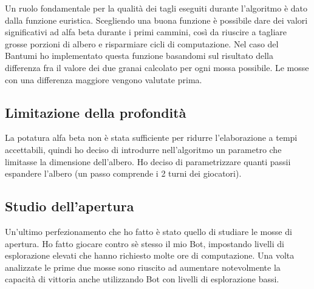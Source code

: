 \documentclass[paper=a4, fontsize=11pt]{scrartcl}	%
\numberwithin{equation}{section}															%
\numberwithin{figure}{section}																%
\numberwithin{table}{section}																%
\begin{document}
Un ruolo fondamentale per la qualit\`a dei tagli eseguiti durante l'algoritmo \`e dato dalla funzione euristica. Scegliendo una buona funzione \`e possibile dare dei valori significativi ad alfa beta durante i primi cammini, cos\`i da riuscire a tagliare grosse porzioni di albero e risparmiare cicli di computazione.
Nel caso del Bantumi ho implementato questa funzione basandomi sul risultato della differenza fra il valore dei due granai calcolato per ogni mossa possibile. Le mosse con una differenza maggiore vengono valutate prima.
\subsection{Limitazione della profondit\`a}
La potatura alfa beta non \`e stata sufficiente per ridurre l'elaborazione a tempi accettabili, quindi ho deciso di introdurre nell'algoritmo un parametro che limitasse la dimensione dell'albero. Ho deciso di parametrizzare quanti passii espandere l'albero (un passo comprende i 2 turni dei giocatori).
\subsection{Studio dell'apertura}
Un'ultimo perfezionamento che ho fatto \`e stato quello di studiare le mosse di apertura. Ho fatto giocare contro s\`e stesso il mio Bot, impostando livelli di esplorazione elevati che hanno richiesto molte ore di computazione. Una volta analizzate le prime due mosse sono riuscito ad aumentare notevolmente la capacit\`a di vittoria anche utilizzando Bot con livelli di esplorazione bassi.
\end{document}
